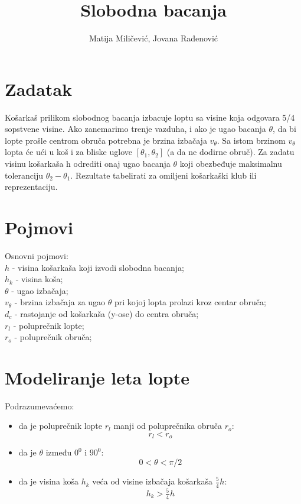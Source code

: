 \documentclass[a4paper, 12pt]{article}
\begin{document}
\title{Slobodna bacanja}

\author{Matija Miličević, Jovana Rađenović}

\maketitle

\section{Zadatak}

Košarkaš prilikom slobodnog bacanja izbacuje loptu sa visine koja odgovara 5/4 sopstvene visine. Ako zanemarimo trenje vazduha, i ako je ugao bacanja $\theta$, da bi lopte prošle centrom obruča potrebna je brzina izbačaja $v_\theta$. Sa istom brzinom $v_\theta$ lopta će ući u koš i za bliske uglove $[\theta_1, \theta_2]$ (a da ne dodirne obruč). Za zadatu visinu košarkaša h odrediti onaj ugao bacanja $\theta$ koji obezbeđuje maksimalnu toleranciju $\theta_2 - \theta_1$. Rezultate tabelirati za omiljeni košarkaški klub ili reprezentaciju.

\section{Pojmovi}

Osnovni pojmovi:\\
$h$ - visina košarkaša koji izvodi slobodna bacanja;\\
$h_k$ - visina koša;\\
$\theta$ - ugao izbačaja;\\
$v_\theta$ - brzina izbačaja za ugao $\theta$ pri kojoj lopta prolazi kroz centar obruča;\\
$d_c$ - rastojanje od košarkaša (y-ose) do centra obruča;\\
$r_l$ - poluprečnik lopte;\\
$r_o$ - poluprečnik obruča;\\


\pagebreak


\section{Modeliranje leta lopte} %

Podrazumevaćemo:
\begin{itemize}

\item da je poluprečnik lopte $r_l$ manji od poluprečnika obruča $r_o$:
\[r_l<r_o\] %

\item da je $\theta$ između $0^0$ i $90^0$:\\
\[0 < \theta < \pi/2\]

\item da je visina koša $h_k$ veća od visine izbačaja košarkaša $\dfrac{_5}{^4}h$:\\
\[h_k > \dfrac{_5}{^4}h\]  %

\end{itemize}
\end{document}
